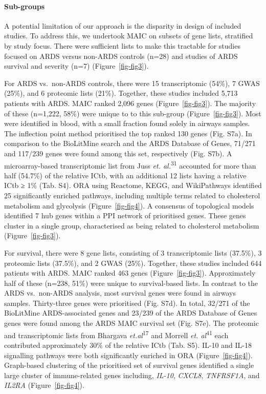 \documentclass[
  11,
  a4paper,
]{article}
\let\oldparagraph\paragraph
\renewcommand{\paragraph}[1]{\oldparagraph{#1}\mbox{}}
\begin{document}
\hypertarget{sub-groups}{%
\paragraph{Sub-groups}\label{sub-groups}}

A potential limitation of our approach is the disparity in design of
included studies. To address this, we undertook MAIC on subsets of gene
lists, stratified by study focus. There were sufficient lists to make
this tractable for studies focused on ARDS versus non-ARDS controls
(n=28) and studies of ARDS survival and severity (n=7)
(Figure~\ref{fig-fig3}).

For ARDS vs.~non-ARDS controls, there were 15 transcriptomic (54\%), 7
GWAS (25\%), and 6 proteomic lists (21\%). Together, these studies
included 5,713 patients with ARDS. MAIC ranked 2,096 genes
(Figure~\ref{fig-fig3}). The majority of these (n=1,222, 58\%) were
unique to to this sub-group (Figure~\ref{fig-fig3}). Most were
identified in blood, with a small fraction found solely in airways
samples. The inflection point method prioritised the top ranked 130
genes (Fig. S7a). In comparison to the BioLitMine search and the ARDS
Database of Genes, 71/271 and 117/239 genes were found among this set,
respectively (Fig. S7b). A microarray-based transcriptomic list from
Juss \emph{et. al.}\textsuperscript{31} accounted for more than half
(54.7\%) of the relative ICtb, with an additional 12 lists having a
relative ICtb ≥ 1\% (Tab. S4). ORA using Reactome, KEGG, and
WikiPathways identified 25 significantly enriched pathways, including
multiple terms related to cholesterol metabolism and glycolysis
(Figure~\ref{fig-fig4}). A consensus of topological models identified 7
hub genes within a PPI network of prioritised genes. These genes cluster
in a single group, characterised as being related to cholesterol
metabolism (Figure~\ref{fig-fig3}).

For survival, there were 8 gene lists, consisting of 3 transcriptomic
lists (37.5\%), 3 proteomic lists (37.5\%), and 2 GWAS (25\%). Together,
these studies included 644 patients with ARDS. MAIC ranked 463 genes
(Figure~\ref{fig-fig3}). Approximately half of these (n=238, 51\%) were
unique to survival-based lists. In contrast to the ARDS vs.~non-ARDS
analysis, most survival genes were found in airways samples.
Thirty-three genes were prioritised (Fig. S7d). In total, 32/271 of the
BioLitMine ARDS-associated genes and 23/239 of the ARDS Database of
Genes genes were found among the ARDS MAIC survival set (Fig. S7e). The
proteomic and transcriptomic lists from Bhargava
\emph{et.al}\textsuperscript{17} and Morrell \emph{et.
al}\textsuperscript{41} each contributed approximately 30\% of the
relative ICtb (Tab. S5). IL-10 and IL-18 signalling pathways were both
significantly enriched in ORA (Figure~\ref{fig-fig4}). Graph-based
clustering of the prioritised set of survival genes identified a single
large cluster of immune-related genes including, \emph{IL-10},
\emph{CXCL8}, \emph{TNFRSF1A}, and \emph{IL2RA} (Figure~\ref{fig-fig4}).
\end{document}
